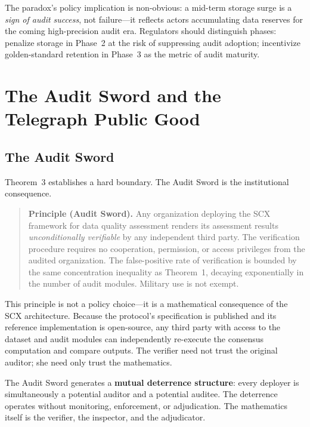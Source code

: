 \documentclass[twocolumn]{article}
\theoremstyle{definition}
\begin{document}
The paradox's policy implication is non-obvious: a mid-term storage surge is a \emph{sign of audit success}, not failure---it reflects actors accumulating data reserves for the coming high-precision audit era. Regulators should distinguish phases: penalize storage in Phase~2 at the risk of suppressing audit adoption; incentivize golden-standard retention in Phase~3 as the metric of audit maturity.

\section{The Audit Sword and the Telegraph Public Good}
\label{sec:audit}
\label{sec:telegraph}

\subsection{The Audit Sword}

Theorem~3 establishes a hard boundary. The Audit Sword is the institutional consequence.

\begin{quote}
\textbf{Principle (Audit Sword).} Any organization deploying the SCX framework for data quality assessment renders its assessment results \emph{unconditionally verifiable} by any independent third party. The verification procedure requires no cooperation, permission, or access privileges from the audited organization. The false-positive rate of verification is bounded by the same concentration inequality as Theorem~1, decaying exponentially in the number of audit modules. Military use is not exempt.
\end{quote}

This principle is not a policy choice---it is a mathematical consequence of the SCX architecture. Because the protocol's specification is published and its reference implementation is open-source, any third party with access to the dataset and audit modules can independently re-execute the consensus computation and compare outputs. The verifier need not trust the original auditor; she need only trust the mathematics.

The Audit Sword generates a \textbf{mutual deterrence structure}: every deployer is simultaneously a potential auditor and a potential auditee. The deterrence operates without monitoring, enforcement, or adjudication. The mathematics itself is the verifier, the inspector, and the adjudicator.
\end{document}
